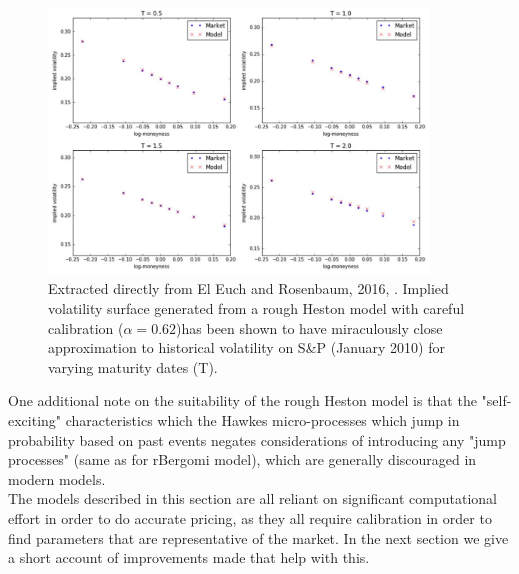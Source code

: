 \documentclass[12pt,oneside]{article}
\begin{document}
\begin{figure}[htpb]
    \centering
    \includegraphics[width=0.9\textwidth ]{figs/Omar2016_fig51.jpg}
    \caption{Extracted directly from El Euch and Rosenbaum, 2016, \cite[Figure~5.1]{Omar2016}. Implied volatility surface generated from a rough Heston model with careful calibration ($\alpha=0.62$)has been shown to have miraculously close approximation to historical volatility on S\&P (January 2010) for varying maturity dates (T).}
    \label{fig:elEuch_1}
\end{figure}

One additional note on the suitability of the rough Heston model is that the  "self-exciting" characteristics which the Hawkes micro-processes which jump in probability based on past events negates considerations of introducing any "jump processes" (same as for rBergomi model), which are generally discouraged in modern models. 
\\

The models described in this section are all reliant on significant computational effort in order to do accurate pricing, as they all require calibration in order to find parameters that are representative of the market. In the next section we give a short account of improvements made that help with this.
\end{document}
